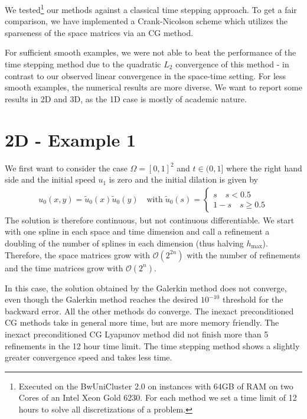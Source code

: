 \documentclass{article}
\begin{document}
We tested\footnote{Executed on the BwUniCluster 2.0 on instances with 64GB of RAM on two Cores of an Intel Xeon Gold 6230. For each method we set a time limit of 12 hours to solve all discretizations of a problem. } our methods against a classical time stepping approach. To get a fair comparison, we have implemented a Crank-Nicolson scheme which utilizes the sparseness of the space matrices via an CG method. 

For sufficient smooth examples, we were not able to beat the performance of the time stepping method due to the quadratic $L_2$ convergence of this method - in contrast to our observed linear convergence in the space-time setting. For less smooth examples, the numerical results are more diverse. We want to report some results in 2D and 3D, as the 1D case is mostly of academic nature.

\section*{2D - Example 1}
We first want to consider the case $\Omega = [0,1]^2$ and $t \in (0, 1]$ where the right hand side and the initial speed $u_1$ is zero and the initial dilation is given by
\begin{align*}
u_0(x,y) = \tilde{u}_0(x) \tilde{u}_0(y) \quad \text{with}\;
\tilde{u}_0(s) = \begin{cases}
s \quad s < 0.5 \\
1-s \quad s \geq 0.5
\end{cases}
\end{align*} 
The solution is therefore continuous, but not continuous differentiable. We start with one spline in each space and time dimension and call a refinement a doubling of the number of splines in each dimension (thus halving $h_\text{max}$). Therefore, the space matrices grow with $\mathcal{O}(2^{2n})$ with the number of refinements and the time matrices grow with $\mathcal{O}(2^{n})$.

In this case, the solution obtained by the Galerkin method does not converge, even though the Galerkin method reaches the desired $10^{-10}$ threshold for the backward error. All the other methods do converge. The inexact preconditioned CG methods take in general more time, but are more memory friendly. The inexact preconditioned CG Lyapunov method did not finish more than 5 refinements in the 12 hour time limit. The time stepping method shows a slightly greater convergence speed and takes less time.
\end{document}
